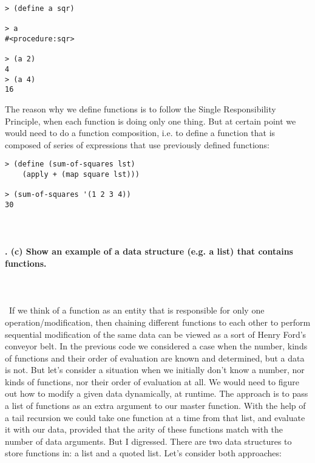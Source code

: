 \documentclass{article}
\begin{document}
\begin{verbatim} 
> (define a sqr)

> a
#<procedure:sqr>

> (a 2)
4
> (a 4)
16
\end{verbatim}

The reason why we define functions is to follow the Single Responsibility Principle, when each function is doing only one thing. But at certain point we would need to do a function composition, i.e. to define a function that is composed of series of expressions that use previously defined functions:

\begin{verbatim} 
> (define (sum-of-squares lst)
    (apply + (map square lst)))
    
> (sum-of-squares '(1 2 3 4))
30
\end{verbatim}

\paragraph{}\
\paragraph{. (c) Show an example of a data structure (e.g. a list) that contains functions.}\
\paragraph{}\
If we think of a function as an entity that is responsible for only one operation/modification, then chaining different functions to each other to perform sequential modification of the same data can be viewed as a sort of Henry Ford's conveyor belt. In the previous code we considered a case when the number, kinds of functions and their order of evaluation are known and determined, but a data is not. But let's consider a situation when we initially don't know a number, nor kinds of functions, nor their order of evaluation at all. We would need to figure out how to modify a given data dynamically, at runtime. The approach is to pass a list of functions as an extra argument to our master function. With the help of a tail recursion we could take one function at a time from that list, and evaluate it with our data, provided that the arity of these functions match with the number of data arguments. But I digressed. There are two data structures to store functions in: a list and a quoted list. Let's consider both approaches:
\end{document}
